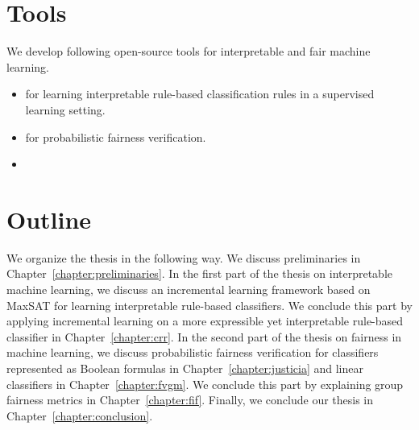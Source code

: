 \section{Tools}
	We develop following open-source tools for interpretable and fair machine learning.
	\begin{itemize}
		\item \href{https://github.com/meelgroup/MLIC}{{\imli}} for learning interpretable rule-based classification rules in a supervised learning setting.
		\item  \href{https://github.com/meelgroup/justicia}{\justicia} for probabilistic fairness verification.
		\item {}
	\end{itemize}
\section{Outline}
We organize the thesis in the following way. We discuss preliminaries in Chapter~\ref{chapter:preliminaries}. In the first part of the thesis on interpretable machine learning, we discuss an incremental learning framework based on MaxSAT for learning interpretable rule-based classifiers. We conclude this part by applying incremental learning on a more expressible yet interpretable rule-based classifier in Chapter~\ref{chapter:crr}. In the second part of the thesis on fairness in machine learning, we discuss probabilistic fairness verification for classifiers represented as Boolean formulas in Chapter~\ref{chapter:justicia} and linear classifiers in Chapter~\ref{chapter:fvgm}. We conclude this part by explaining group fairness metrics in Chapter~\ref{chapter:fif}. Finally, we conclude our thesis in Chapter~\ref{chapter:conclusion}.


